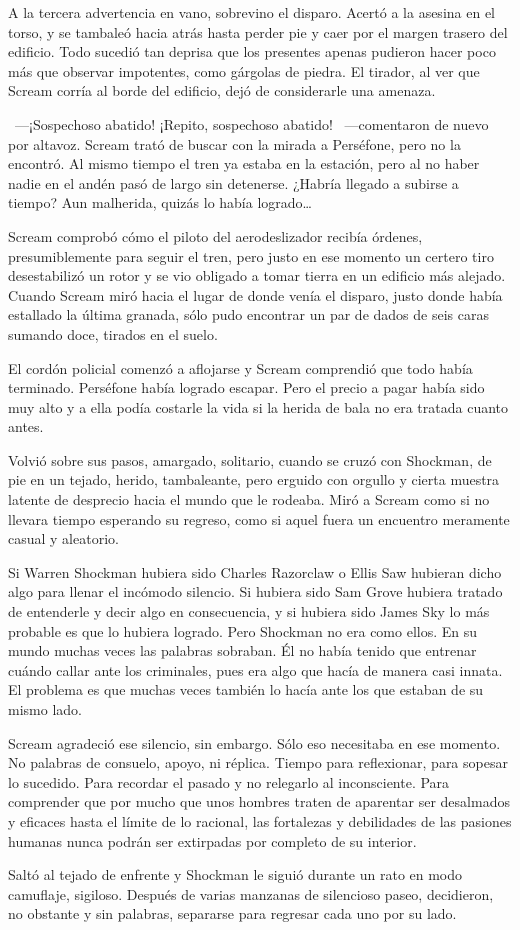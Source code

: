 A la tercera advertencia en vano, sobrevino el disparo. Acertó a la asesina en el torso, y se tambaleó hacia atrás hasta perder pie y caer por el margen trasero del edificio. Todo sucedió tan deprisa que los presentes apenas pudieron hacer poco más que observar impotentes, como gárgolas de piedra. El tirador, al ver que Scream corría al borde del edificio, dejó de considerarle una amenaza.

~---¡Sospechoso abatido! ¡Repito, sospechoso abatido! ~---comentaron de nuevo por altavoz. Scream trató de buscar con la mirada a Perséfone, pero no la encontró. Al mismo tiempo el tren ya estaba en la estación, pero al no haber nadie en el andén pasó de largo sin detenerse. ¿Habría llegado a subirse a tiempo? Aun malherida, quizás lo había logrado\dots

Scream comprobó cómo el piloto del aerodeslizador recibía órdenes, presumiblemente para seguir el tren, pero justo en ese momento un certero tiro desestabilizó un rotor y se vio obligado a tomar tierra en un edificio más alejado. Cuando Scream miró hacia el lugar de donde venía el disparo, justo donde había estallado la última granada, sólo pudo encontrar un par de dados de seis caras sumando doce, tirados en el suelo.

El cordón policial comenzó a aflojarse y Scream comprendió que todo había terminado. Perséfone había logrado escapar. Pero el precio a pagar había sido muy alto y a ella podía costarle la vida si la herida de bala no era tratada cuanto antes.

Volvió sobre sus pasos, amargado, solitario, cuando se cruzó con Shockman, de pie en un tejado, herido, tambaleante, pero erguido con orgullo y cierta muestra latente de desprecio hacia el mundo que le rodeaba. Miró a Scream como si no llevara tiempo esperando su regreso, como si aquel fuera un encuentro meramente casual y aleatorio.

Si Warren Shockman hubiera sido Charles Razorclaw o Ellis Saw hubieran dicho algo para llenar el incómodo silencio. Si hubiera sido Sam Grove hubiera tratado de entenderle y decir algo en consecuencia, y si hubiera sido James Sky lo más probable es que lo hubiera logrado. Pero Shockman no era como ellos. En su mundo muchas veces las palabras sobraban. Él no había tenido que entrenar cuándo callar ante los criminales, pues era algo que hacía de manera casi innata. El problema es que muchas veces también lo hacía ante los que estaban de su mismo lado.

Scream agradeció ese silencio, sin embargo. Sólo eso necesitaba en ese momento. No palabras de consuelo, apoyo, ni réplica. Tiempo para reflexionar, para sopesar lo sucedido. Para recordar el pasado y no relegarlo al inconsciente. Para comprender que por mucho que unos hombres traten de aparentar ser desalmados y eficaces hasta el límite de lo racional, las fortalezas y debilidades de las pasiones humanas nunca podrán ser extirpadas por completo de su interior.

Saltó al tejado de enfrente y Shockman le siguió durante un rato en modo camuflaje, sigiloso. Después de varias manzanas de silencioso paseo, decidieron, no obstante y sin palabras, separarse para regresar cada uno por su lado.
